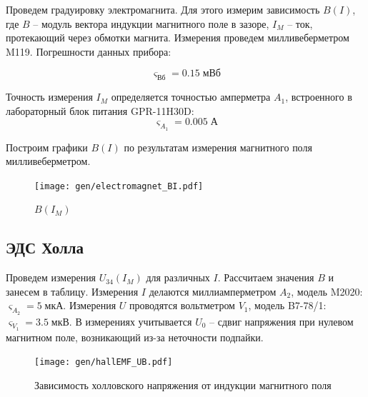 \documentclass[12pt,a4paper]{article}
\begin{document}
	Проведем градуировку электромагнита. Для этого измерим зависимость $B(I)$, где $B$ -- модуль вектора индукции магнитного поле в зазоре, $I_M$ -- ток, протекающий через обмотки магнита. Измерения проведем милливеберметром M119. Погрешности данных прибора:
	
	$$ \varsigma_{\text{Вб}} = 0.15 \; \text{мВб}$$
	
	Точность измерения $I_M$ определяется точностью амперметра $A_1$, встроенного в лабораторный блок питания GPR-11H30D: $$\varsigma_{A_1} = 0.005 \; \text{А}$$
	

	Построим графики $B(I)$ по результатам измерения магнитного поля милливеберметром.
	
	\begin{figure}[H]
		\texttt{[image: gen/electromagnet\_BI.pdf]}
		\caption{$B(I_M)$}
	\end{figure}
	
	\subsection*{ЭДС Холла}

	Проведем измерения $U_{34}(I_M)$ для различных $I$. Рассчитаем значения $B$ и занесем в таблицу.
	Измерения $I$ делаются миллиамперметром $A_2$, модель M2020: $\varsigma_{A_2} = 5 \; \text{мкА} $.
	Измерения $U$ проводятся вольтметром $V_1$, модель B7-78/1: $\varsigma_{V_1} = 3.5 \; \text{мкВ}$.
	В измерениях учитывается $U_0$ -- сдвиг напряжения при нулевом магнитном поле, возникающий из-за неточности подпайки.
	
	
		
	\begin{figure}[H]
		\texttt{[image: gen/hallEMF\_UB.pdf]}
		\caption{Зависимость холловского напряжения от индукции магнитного поля}
	\end{figure}
\end{document}
